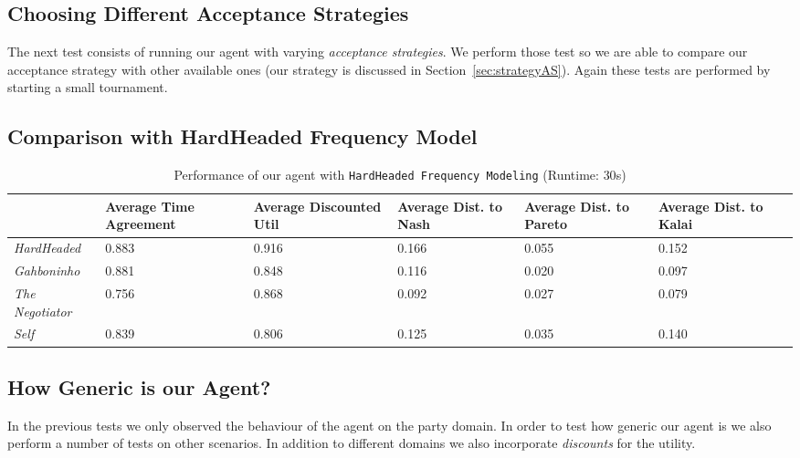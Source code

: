 
\subsection{Choosing Different Acceptance Strategies}

The next test consists of running our agent with varying \emph{acceptance strategies}. We perform those test so we are able to compare our acceptance strategy with other available ones (our strategy is discussed in Section~\ref{sec:strategyAS}). Again these tests are performed by starting a small tournament. \\


\subsection{Comparison with HardHeaded Frequency Model}

\begin{table}[H]
	\centering
	\small
    \begin{tabular}{l|p{2cm}|p{2cm}|p{2cm}|p{2cm}|p{2cm}|p{2cm}|}
    ~              & Average Time Agreement & Average Discounted Util & Average Dist. to Nash & Average Dist. to Pareto & Average Dist. to Kalai \\
    \hline
    \emph{HardHeaded}		& 0.883  & 0.916  & 0.166  & 0.055  & 0.152   \\ \hline
    \emph{Gahboninho}   	& 0.881  & 0.848  & 0.116  & 0.020  & 0.097   \\ \hline
    \emph{The Negotiator} 	& 0.756  & 0.868  & 0.092  & 0.027  & 0.079   \\ \hline
    \emph{Self}             & 0.839  & 0.806  & 0.125  & 0.035  & 0.140   \\ \hline
    \end{tabular}
    \caption{Performance of our agent with \texttt{HardHeaded Frequency Modeling} (Runtime: $30$s) \label{table:anac2011-results}}
\end{table}

\subsection{How Generic is our Agent?}

In the previous tests we only observed the behaviour of the agent on the party domain. In order to test how generic our agent is we also perform a number of tests on other scenarios. In addition to different domains we also incorporate \emph{discounts} for the utility. \\


